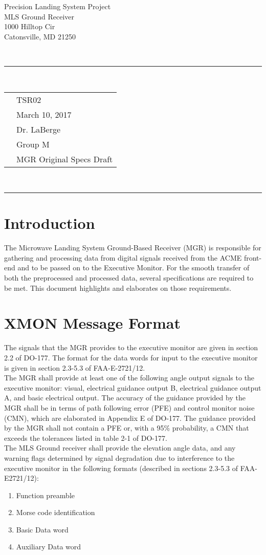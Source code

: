 \documentclass[11pt]{article}
\newcommand{\header}[5]{
	\begin{centering}
		\parbox{6.8in}{
		\begin{flushright}
		\begin{spacing}{.8}{
		\fontfamily{cmss}{\large{\textbf{#1}}\\}}
		\small{
			#2\\
			#3\\
			#4\\
			#5}\\
		\end{spacing}
		\end{flushright}
		\vspace{-7.5mm}
		}\\
		\rule{\textwidth}{0.5pt}\\
		\vspace{-4mm}
	\end{centering}
}
\newcommand{\documentinfo}[5]{
	\begin{centering}
		\parbox{6.8in}{
		\begin{spacing}{1}
			\begin{flushleft}
				\begin{tabular}{l l}
					\fontfamily{cmss}{\textbf{DOC \#: }} & #1 \\
					\fontfamily{cmss}{\textbf{DATE: }} & #2 \\
					\fontfamily{cmss}{\textbf{TO: }} & #3 \\
					\fontfamily{cmss}{\textbf{FROM: }} & #4 \\
					\fontfamily{cmss}{\textbf{SUBJECT: }} & #5 \\
				\end{tabular}\\
				\rule{\textwidth}{1pt}
			\end{flushleft}
		\end{spacing}
		}
	\end{centering}
}
\begin{document}
\header{CMPE349}{Precision Landing System Project}{MLS Ground Receiver}{1000 Hilltop Cir}{Catonsville, MD 21250}

\documentinfo{TSR02}{March 10, 2017}{Dr. LaBerge}{Group M}{MGR Original Specs Draft}

	\section{Introduction}
	The Microwave Landing System Ground-Based Receiver (MGR) is responsible for gathering and processing data from digital signals received from the ACME front-end and to be passed on to the Executive Monitor. For the smooth transfer of both the preprocessed and processed data, several specifications are required to be met. This document highlights and elaborates on those requirements.

	\section{XMON Message Format}
	The signals that the MGR provides to the executive monitor are given in section 2.2 of DO-177. The format for the data words for input to the executive monitor is given in section 2.3-5.3 of FAA-E-2721/12.\\
	The MGR shall provide at least one of the following angle output signals to the executive monitor: visual, electrical guidance output B, electrical guidance output A, and basic electrical output. The accuracy of the guidance provided by the MGR shall be in terms of path following error (PFE) and control monitor noise (CMN), which are elaborated in Appendix E of DO-177. The guidance provided by the MGR shall not contain a PFE or, with a 95\% probability, a CMN that exceeds the tolerances listed in table 2-1 of DO-177.\\
	The MLS Ground receiver shall provide the elevation angle data, and any warning flags determined by signal degradation due to interference to the executive monitor in the following formats (described in sections 2.3-5.3 of FAA-E2721/12):
		\begin{enumerate}

			\item Function preamble

			\item Morse code identification

			\item Basic Data word

			\item Auxiliary Data word

		\end{enumerate}
\end{document}
